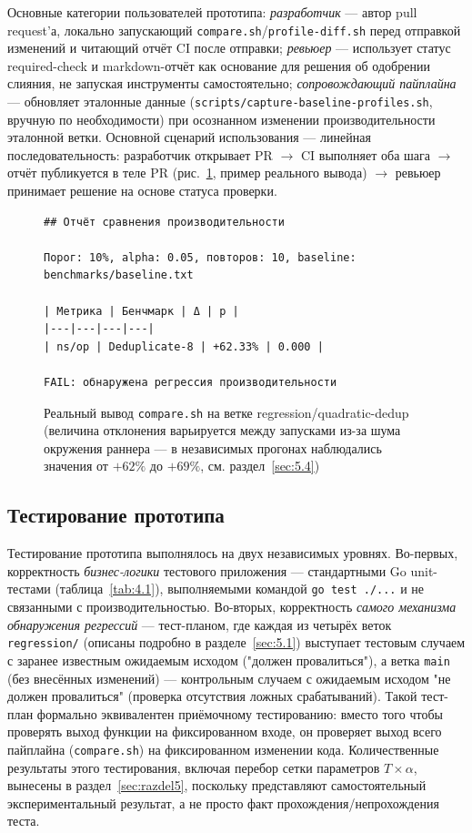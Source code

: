 \documentclass[12pt,a4paper]{article}
\numberwithin{equation}{section}
\begin{document}
Основные категории пользователей прототипа: \emph{разработчик} — автор
pull request'а, локально запускающий \texttt{compare.sh}/\texttt{profile-diff.sh}
перед отправкой изменений и читающий отчёт CI после отправки;
\emph{ревьюер} — использует статус required-check и markdown-отчёт как
основание для решения об одобрении слияния, не запуская инструменты
самостоятельно; \emph{сопровождающий пайплайна} — обновляет эталонные
данные (\texttt{scripts/\allowbreak capture-baseline-profiles.sh}, вручную по
необходимости) при осознанном изменении производительности эталонной
ветки. Основной сценарий использования — линейная последовательность:
разработчик открывает PR $\to$ CI выполняет оба шага $\to$ отчёт публикуется
в теле PR (рис.~\ref{fig:4.1}, пример реального вывода) $\to$ ревьюер
принимает решение на основе статуса проверки.

\begin{figure}[htbp]
\centering
\begin{lstlisting}[language={},basicstyle=\ttfamily\fontsize{8.5}{10}\selectfont,frame=single,backgroundcolor=\color{codebg}]
## Отчёт сравнения производительности

Порог: 10%, alpha: 0.05, повторов: 10, baseline: benchmarks/baseline.txt

| Метрика | Бенчмарк | Δ | p |
|---|---|---|---|
| ns/op | Deduplicate-8 | +62.33% | 0.000 |

FAIL: обнаружена регрессия производительности
\end{lstlisting}
\caption{Реальный вывод \texttt{compare.sh} на ветке regression/quadratic-dedup (величина отклонения варьируется между запусками из-за шума окружения раннера --- в независимых прогонах наблюдались значения от $+62\%$ до $+69\%$, см. раздел~\ref{sec:5.4})}
\label{fig:4.1}
\end{figure}

\subsection{Тестирование прототипа}
\label{sec:4.4}

Тестирование прототипа выполнялось на двух независимых уровнях. Во-первых,
корректность \emph{бизнес-логики} тестового приложения — стандартными
Go unit-тестами (таблица~\ref{tab:4.1}), выполняемыми командой \texttt{go
test ./\allowbreak ...} и не связанными с производительностью. Во-вторых, корректность
\emph{самого механизма обнаружения регрессий} — тест-планом, где каждая из
четырёх веток \texttt{regression/\allowbreak *} (описаны подробно в
разделе~\ref{sec:5.1}) выступает тестовым случаем с заранее известным
ожидаемым исходом ("должен провалиться"), а ветка \texttt{main} (без
внесённых изменений) — контрольным случаем с ожидаемым исходом "не должен
провалиться" (проверка отсутствия ложных срабатываний). Такой тест-план
формально эквивалентен приёмочному тестированию: вместо того чтобы
проверять выход функции на фиксированном входе, он проверяет выход всего
пайплайна (\texttt{compare.sh}) на фиксированном изменении кода.
Количественные результаты этого тестирования, включая перебор сетки
параметров $T \times \alpha$, вынесены в раздел~\ref{sec:razdel5}, поскольку
представляют самостоятельный экспериментальный результат, а не просто
факт прохождения/непрохождения теста.
\end{document}
